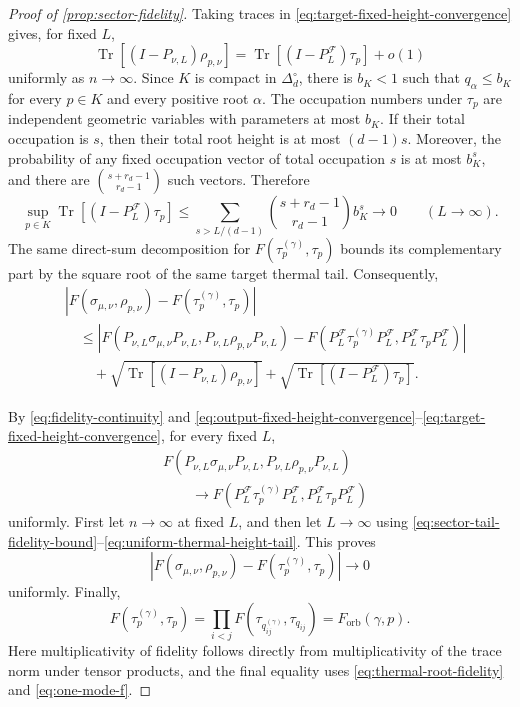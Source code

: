 \documentclass[11pt]{article}
\theoremstyle{remark}
\theoremstyle{plain}
\newcommand{\cF}{\mathcal F}
\newcommand{\Tr}{\operatorname{Tr}}
\newcommand{\Forb}{F_{\mathrm{orb}}}
\begin{document}
\begin{proof}[Proof of \cref{prop:sector-fidelity}]
Taking traces in \eqref{eq:target-fixed-height-convergence} gives, for fixed
\(L\),
\[
  \Tr[(I-P_{\nu,L})\rho_{p,\nu}]
  =\Tr[(I-P_L^{\cF})\tau_p]+o(1)
\]
uniformly as \(n\to\infty\).  Since \(K\) is
compact in \(\Delta_d^\circ\), there is \(b_K<1\) such that
\(q_\alpha\le b_K\) for every \(p\in K\) and every positive root
\(\alpha\).  The occupation numbers under \(\tau_p\) are independent
geometric variables with parameters at most \(b_K\).  If their total
occupation is \(s\), then their total root height is at most \((d-1)s\).
Moreover, the probability of any fixed occupation vector of total occupation
\(s\) is at most \(b_K^s\), and there are
\(\binom{s+r_d-1}{r_d-1}\) such vectors.  Therefore
\begin{equation}\label{eq:uniform-thermal-height-tail}
  \sup_{p\in K}\Tr[(I-P_L^{\cF})\tau_p]
  \le
  \sum_{s>L/(d-1)}\binom{s+r_d-1}{r_d-1}b_K^s
  \longrightarrow0\qquad(L\to\infty).
\end{equation}
The same direct-sum decomposition for
\(F(\tau_p^{(\gamma)},\tau_p)\) bounds its complementary part by the square
root of the same target thermal tail.  Consequently,
\[
\begin{aligned}
 &\left|F(\sigma_{\mu,\nu},\rho_{p,\nu})
       -F(\tau_p^{(\gamma)},\tau_p)\right|\\
 &\quad\le
 \left|F(P_{\nu,L}\sigma_{\mu,\nu}P_{\nu,L},
         P_{\nu,L}\rho_{p,\nu}P_{\nu,L})
       -F(P_L^{\cF}\tau_p^{(\gamma)}P_L^{\cF},
          P_L^{\cF}\tau_pP_L^{\cF})\right|\\
 &\qquad+
 \sqrt{\Tr[(I-P_{\nu,L})\rho_{p,\nu}]}
 +\sqrt{\Tr[(I-P_L^{\cF})\tau_p]}.
\end{aligned}
\]

By \eqref{eq:fidelity-continuity} and
\eqref{eq:output-fixed-height-convergence}--\eqref{eq:target-fixed-height-convergence},
for every fixed \(L\),
\[
\begin{aligned}
  &F(P_{\nu,L}\sigma_{\mu,\nu}P_{\nu,L},
     P_{\nu,L}\rho_{p,\nu}P_{\nu,L})\\
  &\qquad\longrightarrow
  F(P_L^{\cF}\tau_p^{(\gamma)}P_L^{\cF},
    P_L^{\cF}\tau_pP_L^{\cF})
\end{aligned}
\]
uniformly.  First let \(n\to\infty\) at fixed \(L\), and then let
\(L\to\infty\) using
\eqref{eq:sector-tail-fidelity-bound}--\eqref{eq:uniform-thermal-height-tail}.
This proves
\[
  \left|F(\sigma_{\mu,\nu},\rho_{p,\nu})
  -F(\tau_p^{(\gamma)},\tau_p)\right|\longrightarrow0
\]
uniformly.  Finally,
\[
  F(\tau_p^{(\gamma)},\tau_p)
  =\prod_{i<j}F(\tau_{q_{ij}^{(\gamma)}},\tau_{q_{ij}})
  =\Forb(\gamma,p).
\]
Here multiplicativity of fidelity follows directly from multiplicativity of
the trace norm under tensor products, and the final equality uses
\eqref{eq:thermal-root-fidelity} and \eqref{eq:one-mode-f}.
\end{proof}
\end{document}
